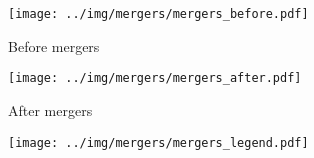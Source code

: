 \documentclass{article}
\begin{document}
\begin{figure}[h]
\centering
\hfill
\begin{subfigure}[b]{0.3\textwidth}
    \centering
    \texttt{[image: ../img/mergers/mergers\_before.pdf]}
    \caption{Before mergers}
    \label{fig:mergers_before}
\end{subfigure}
\hfill
\begin{subfigure}[b]{0.3\textwidth}
    \centering
    \texttt{[image: ../img/mergers/mergers\_after.pdf]}
    \caption{After mergers}
    \label{fig:mergers_after}
\end{subfigure}
\hfill
\begin{subfigure}[b]{0.3\textwidth}
    \centering
    \texttt{[image: ../img/mergers/mergers\_legend.pdf]}
\end{subfigure}
\hfill
\label{fig:mergers}
\end{figure}
\end{document}
